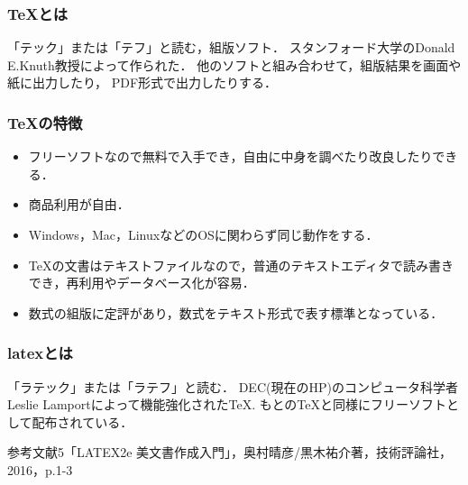 \subsubsection{TeXとは}
「テック」または「テフ」と読む，組版ソフト．
スタンフォード大学のDonald E.Knuth教授によって作られた．
他のソフトと組み合わせて，組版結果を画面や紙に出力したり，
PDF形式で出力したりする．

\subsubsection{TeXの特徴}
\begin{itemize}
\item フリーソフトなので無料で入手でき，自由に中身を調べたり改良したりできる．
\item 商品利用が自由．
\item Windows，Mac，LinuxなどのOSに関わらず同じ動作をする．
\item TeXの文書はテキストファイルなので，普通のテキストエディタで読み書きでき，再利用やデータベース化が容易．
\item 数式の組版に定評があり，数式をテキスト形式で表す標準となっている．
\end{itemize}
\subsubsection{latexとは}
「ラテック」または「ラテフ」と読む．
DEC(現在のHP)のコンピュータ科学者Leslie Lamportによって機能強化されたTeX.
もとのTeXと同様にフリーソフトとして配布されている．

参考文献5「LATEX2e 美文書作成入門」，奥村晴彦/黒木祐介著，技術評論社，2016，p.1-3

